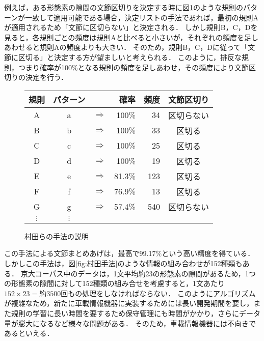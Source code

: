 例えば，ある形態素の隙間の文節区切りを決定する時に図\ref{fig:村田リスト}のような規則のパターンが一致して適用可能である場合，決定リストの手法であれば，最初の規則Aが適用されるため「文節に区切らない」と決定される．
しかし規則B，C，Dを見ると，各規則ごとの頻度は規則Aと比べると小さいが，それぞれの頻度を足しあわせると規則Aの頻度よりも大きい．
そのため，規則B，C，Dに従って「文節に区切る」と決定する方が望ましいと考えられる．
このように，排反な規則，つまり確率が100\%となる規則の頻度を足しあわせ，その頻度により文節区切りの決定を行う．

\begin{figure}
  \begin{center}
    \begin{tabular}{cccrrc}
      \hline
      規則  & パターン  &               & 確率 & 頻度 & 文節区切り\\
      \hline
      A & a & $\Rightarrow$ & 100\%  & 34  & 区切らない\\
      B & b & $\Rightarrow$ & 100\%  & 33  & 区切る\\
      C & c & $\Rightarrow$ & 100\%  & 25  & 区切る\\
      D & d & $\Rightarrow$ & 100\%  & 19  & 区切る\\
      E & e & $\Rightarrow$ & 81.3\% & 123 & 区切る\\
      F & f & $\Rightarrow$ & 76.9\% & 13  & 区切る\\
      G & g & $\Rightarrow$ & 57.4\% & 540 & 区切らない\\
      $\vdots$ & $\vdots$\\
    \end{tabular}
    \caption{村田らの手法の説明}
    
    
    
    \label{fig:村田リスト}
  \end{center}
\end{figure}

この手法による文節まとめあげは，最高で99.17\%という高い精度を得ている．
しかしこの手法は，図\ref{fig:村田手法}のような情報の組み合わせが152種類もある．
京大コーパス中のデータは，1文平均約23の形態素の隙間があるため，1つの形態素の隙間に対して152種類の組み合せを考慮すると，1文あたり$152\times23=約3500回$もの処理をしなければならない．
このようにアルゴリズムが複雑なため，新たに車載情報機器に実装するためには長い開発期間を要し，また規則の学習に長い時間を要するため保守管理にも時間がかかり，さらにデータ量が膨大になるなど様々な問題がある．
そのため，車載情報機器には不向きであるといえる．

